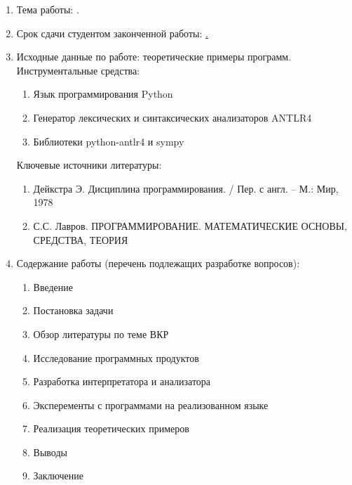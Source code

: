 \begin{enumerate}[1.]
	\item Тема работы: {\expandafter \ulined \thesisTitle.}
	\item Срок сдачи студентом законченной работы: \uline{\thesisDeadline.} 
	\item Исходные данные по работе: теоретические примеры программ.\\
	Инструментальные средства:
	\begin{enumerate}
		\item Язык программирования Python
		\item Генератор лексических и синтаксических анализаторов ANTLR4
		\item Библиотеки python-antlr4 и sympy
	\end{enumerate}
	Ключевые источники литературы:	
	\begin{enumerate}
		\item Дейкстра Э. Дисциплина программирования. / Пер. с англ. -- М.: Мир, 1978
		\item С.С. Лавров. ПРОГРАММИРОВАНИЕ. МАТЕМАТИЧЕСКИЕ ОСНОВЫ, СРЕДСТВА, ТЕОРИЯ
	\end{enumerate}
	\printbibliographyTask
	\item Содержание работы (перечень подлежащих разработке вопросов):
	\begin{enumerate}[label=\theenumi\arabic*.]
		\item Введение
		\item Постановка задачи
		\item Обзор литературы по теме ВКР
		\item Исследование программных продуктов
		\item Разработка интерпретатора и анализатора
		\item Эксперементы с программами на реализованном языке
		\item Реализация теоретических примеров
		\item Выводы
		\item Заключение
	\end{enumerate}

\end{enumerate}
